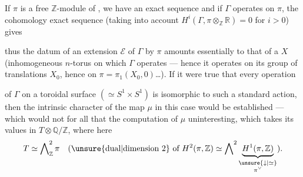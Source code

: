 If \(\pi\) is a free \(\mathbb Z\)-module of
, we have an exact sequence
and if \(\Gamma\) operates on \(\pi\), the cohomology exact sequence
(taking into account \(H^i(\Gamma,\pi\otimes_{\mathbb Z}\mathbb R)=0\)
for \(i>0\)) gives

thus the datum of an extension \(\mathcal E\) of \(\Gamma\) by \(\pi\)
amounts essentially to that of a
 \(X\)
(inhomogeneous \(n\)-torus on which \(\Gamma\) operates --- hence it operates
on its group of translations \(X_0\), hence on
\(\pi=\pi_1(X_0,0)\)\ldots).
If it were true  that every operation



of \(\Gamma\) on a toroidal surface \((\simeq S^1\times S^1)\)
is isomorphic to such a standard action, then the intrinsic character
of the map \(\mu\) in this case would be established
--- which would not for all that  the computation
of \(\mu\) uninteresting, which takes its values in
\(T\otimes\mathbb Q/\mathbb Z\), where here
\[
T\simeq\bigwedge\nolimits_{\mathbb Z}^{2}\pi
\quad
(\text{\unsure{dual|dimension\ 2} of }H^2(\pi,\mathbb Z)\simeq
\bigwedge\nolimits^{2}
\underbrace{H^1(\pi,\mathbb Z)}_{
\substack{\unsure{\downarrow|\simeq}\\ \pi^\vee}}).
\]

